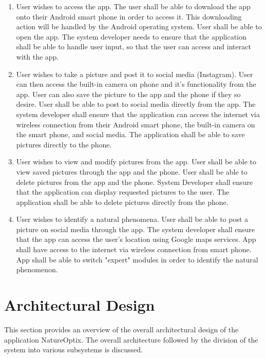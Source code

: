 \documentclass[]{article}
\begin{document}
\begin{enumerate}
	\item User wishes to access the app.  The user shall be able to download the app onto their Android smart phone in order to access it.  This downloading action will be handled by the Android operating system.  User shall be able to open the app.  The system developer needs to ensure that the application shall be able to handle user input, so that the user can access and interact with the app.
	\item User wishes to take a picture and post it to social media (Instagram).  User can then access the built-in camera on phone and it's functionality from the app.  User can also save the picture to the app and the phone if they so desire.  User shall be able to post to social media directly from the app.  The system developer shall ensure that the application can access the internet via wireless connection from their Android smart phone, the built-in camera on the smart phone, and social media.  The application shall be able to save pictures directly to the phone.
	\item User wishes to view and modify pictures from the app.  User shall be able to view saved pictures through the app and the phone.  User shall be able to delete pictures from the app and the phone.  System Developer shall ensure that the application can display requested pictures to the user.  The application shall be able to delete pictures directly from the phone.
	\item User wishes to identify a natural phenomena. User shall be able to post a picture on social media through the app.  The system developer shall ensure that the app can access the user's location using Google maps services. App shall have access to the internet via wireless connection from smart phone. App shall be able to switch "expert" modules in order to identify the natural phenomenon. 
\end{enumerate}



\section{Architectural Design}
\label{sec:architectural_design}
This section provides an overview of the overall architectural design of the application NatureOptix. The overall architecture followed by the division of the system into various subsystems is discussed.
\end{document}
